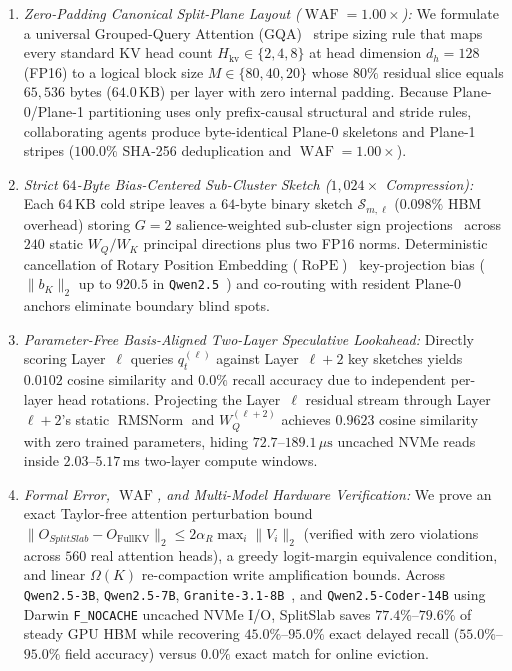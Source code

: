 \documentclass[final,5p,times,twocolumn]{elsarticle}
\theoremstyle{definition}
\theoremstyle{remark}
\newcommand{\SplitSlab}{\textup{\textsc{SplitSlab}}}
\newcommand{\RMSNorm}{\operatorname{RMSNorm}}
\newcommand{\RoPE}{\operatorname{RoPE}}
\newcommand{\WAF}{\operatorname{WAF}}
\def\SplitSlab{SplitSlab}%
\begin{document}
\begin{enumerate}
  \item \emph{Zero-Padding Canonical Split-Plane Layout ($\WAF = 1.00\times$):} We formulate a universal Grouped-Query Attention (GQA)~\cite{ainslie2023gqa} stripe sizing rule that maps every standard KV head count $H_{\mathrm{kv}} \in \{2, 4, 8\}$ at head dimension $d_h = 128$ (FP16) to a logical block size $M \in \{80, 40, 20\}$ whose $80\%$ residual slice equals $65{,}536$ bytes ($64.0$\,KB) per layer with zero internal padding. Because Plane-0/Plane-1 partitioning uses only prefix-causal structural and stride rules, collaborating agents produce byte-identical Plane-0 skeletons and Plane-1 stripes ($100.0\%$ SHA-256 deduplication and $\WAF = 1.00\times$).
  \item \emph{Strict $64$-Byte Bias-Centered Sub-Cluster Sketch ($1{,}024\times$ Compression):} Each $64$\,KB cold stripe leaves a $64$-byte binary sketch $\mathcal{S}_{m,\ell}$ ($0.098\%$ HBM overhead) storing $G=2$ salience-weighted sub-cluster sign projections~\cite{charikar2002simhash,gao2024rabitq} across $240$ static $W_Q/W_K$ principal directions plus two FP16 norms. Deterministic cancellation of Rotary Position Embedding ($\RoPE$)~\cite{su2024roformer} key-projection bias ($\|b_K\|_2$ up to $920.5$ in \texttt{Qwen2.5}~\cite{yang2024qwen25}) and co-routing with resident Plane-0 anchors eliminate boundary blind spots.
  \item \emph{Parameter-Free Basis-Aligned Two-Layer Speculative Lookahead:} Directly scoring Layer~$\ell$ queries $q_t^{(\ell)}$ against Layer~$\ell+2$ key sketches yields $0.0102$ cosine similarity and $0.0\%$ recall accuracy due to independent per-layer head rotations. Projecting the Layer~$\ell$ residual stream through Layer~$\ell+2$'s static $\RMSNorm$ and $W_Q^{(\ell+2)}$ achieves $0.9623$ cosine similarity with zero trained parameters, hiding $72.7$--$189.1\,\mu\mathrm{s}$ uncached NVMe reads inside $2.03$--$5.17$\,ms two-layer compute windows.
  \item \emph{Formal Error, $\WAF$, and Multi-Model Hardware Verification:} We prove an exact Taylor-free attention perturbation bound $\|O_{\SplitSlab} - O_{\mathrm{FullKV}}\|_2 \le 2\alpha_R \max_i\|V_i\|_2$ (verified with zero violations across $560$ real attention heads), a greedy logit-margin equivalence condition, and linear $\Omega(K)$ re-compaction write amplification bounds. Across \texttt{Qwen2.5-3B}, \texttt{Qwen2.5-7B}, \texttt{Granite-3.1-8B}~\cite{mishra2024granite}, and \texttt{Qwen2.5-Coder-14B} using Darwin \texttt{F\_NOCACHE} uncached NVMe I/O, \SplitSlab{} saves $77.4\%$--$79.6\%$ of steady GPU HBM while recovering $45.0\%$--$95.0\%$ exact delayed recall ($55.0\%$--$95.0\%$ field accuracy) versus $0.0\%$ exact match for online eviction.
\end{enumerate}
\end{document}
